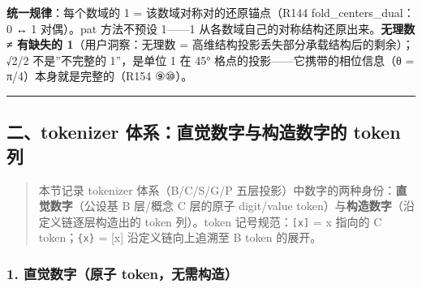 \documentclass[
]{article}
\begin{document}
\textbf{统一规律}：每个数域的 1 = 该数域对称对的还原锚点（R144
fold\_centers\_dual：0 ↔ 1 对偶）。pat 方法不预设 1------1
从各数域自己的对称结构还原出来。\textbf{无理数 ≠ 有缺失的
1}（用户洞察：无理数 = 高维结构投影丢失部分承载结构后的剩余）；√2/2
不是''不完整的 1''，是单位 1 在 45° 格点的投影------它携带的相位信息（θ
= π/4）本身就是完整的（R154 ⑨⑩）。

\begin{center}\rule{0.5\linewidth}{0.5pt}\end{center}

\subsection{二、tokenizer 体系：直觉数字与构造数字的 token
列}\label{ux4e8ctokenizer-ux4f53ux7cfbux76f4ux89c9ux6570ux5b57ux4e0eux6784ux9020ux6570ux5b57ux7684-token-ux5217}

\begin{quote}
本节记录 tokenizer 体系（B/C/S/G/P
五层投影）中数字的两种身份：\textbf{直觉数字}（公设基 B 层/概念 C
层的原子 digit/value token）与\textbf{构造数字}（沿定义链逐层构造出的
token 列）。token 记号规范：\texttt{{[}x{]}} = x 指向的 C
token；\texttt{\{x\}} = {[}x{]} 沿定义链向上追溯至 B token 的展开。
\end{quote}

\subsubsection{1. 直觉数字（原子
token，无需构造）}\label{ux76f4ux89c9ux6570ux5b57ux539fux5b50-tokenux65e0ux9700ux6784ux9020}
\end{document}
